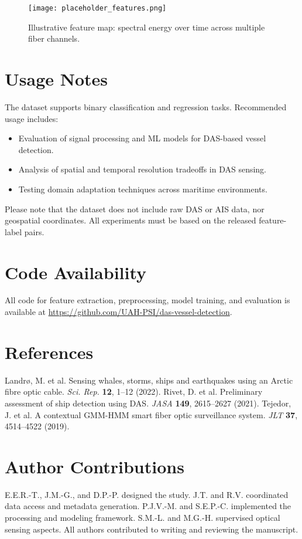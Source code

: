 \documentclass[11pt]{article}
\begin{document}
\begin{figure}[H]
  \centering
  \texttt{[image: placeholder\_features.png]}
  \caption{Illustrative feature map: spectral energy over time across multiple fiber channels.}
\end{figure}

\section*{Usage Notes}
The dataset supports binary classification and regression tasks. Recommended usage includes:
\begin{itemize}
  \item Evaluation of signal processing and ML models for DAS-based vessel detection.
  \item Analysis of spatial and temporal resolution tradeoffs in DAS sensing.
  \item Testing domain adaptation techniques across maritime environments.
\end{itemize}
Please note that the dataset does not include raw DAS or AIS data, nor geospatial coordinates. All experiments must be based on the released feature-label pairs.

\section*{Code Availability}
All code for feature extraction, preprocessing, model training, and evaluation is available at \url{https://github.com/UAH-PSI/das-vessel-detection}.

\section*{References}
\begin{thebibliography}{9}
 Landr\o, M. et al. Sensing whales, storms, ships and earthquakes using an Arctic fibre optic cable. \textit{Sci. Rep.} \textbf{12}, 1–12 (2022).
 Rivet, D. et al. Preliminary assessment of ship detection using DAS. \textit{JASA} \textbf{149}, 2615–2627 (2021).
 Tejedor, J. et al. A contextual GMM-HMM smart fiber optic surveillance system. \textit{JLT} \textbf{37}, 4514–4522 (2019).
\end{thebibliography}

\section*{Author Contributions}
E.E.R.-T., J.M.-G., and D.P.-P. designed the study. J.T. and R.V. coordinated data access and metadata generation. P.J.V.-M. and S.E.P.-C. implemented the processing and modeling framework. S.M.-L. and M.G.-H. supervised optical sensing aspects. All authors contributed to writing and reviewing the manuscript.
\end{document}
